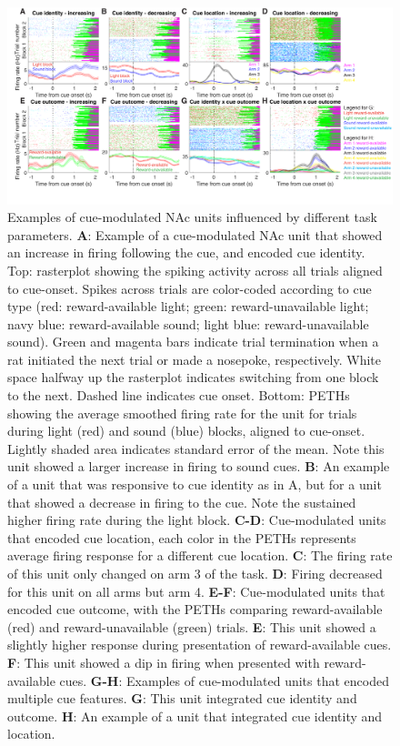 \documentclass[11pt]{article}
\newcommand{\bsf}[1]{\textbf{#1}}
\begin{document}
 \begin{figure}[ht!]
\centering
\includegraphics[width=\textwidth]{Fig 4 - Neural examples.pdf}
\caption{Examples of cue-modulated NAc units influenced by different
  task parameters. \bsf{A}: Example of a cue-modulated NAc unit that showed an
  increase in firing following the cue, and encoded cue identity. Top:
  rasterplot showing the spiking activity across all trials aligned to
  cue-onset. Spikes across trials are color-coded according to cue type (red:
  reward-available light; green: reward-unavailable light; navy blue:
  reward-available sound; light blue: reward-unavailable sound). Green and
  magenta bars indicate trial termination when a rat initiated the next trial or
  made a nosepoke, respectively. White space halfway up the rasterplot indicates
  switching from one block to the next. Dashed line indicates cue onset. Bottom:
  PETHs showing the average smoothed firing rate for the unit for trials during
  light (red) and sound (blue) blocks, aligned to cue-onset. Lightly shaded area
  indicates standard error of the mean. Note this unit showed a larger increase
  in firing to sound cues. \bsf{B}: An example of a unit that was responsive to
  cue identity as in A, but for a unit that showed a decrease in firing to the
  cue. Note the sustained higher firing rate during the light block. \bsf{C-D}:
  Cue-modulated units that encoded cue location, each color in the PETHs
  represents average firing response for a different cue location. \bsf{C}: The
  firing rate of this unit only changed on arm 3 of the task. \bsf{D}: Firing
  decreased for this unit on all arms but arm 4. \bsf{E-F}: Cue-modulated units
  that encoded cue outcome, with the PETHs comparing reward-available (red) and
  reward-unavailable (green) trials. \bsf{E}: This unit showed a slightly higher
  response during presentation of reward-available cues. \bsf{F}: This unit
  showed a dip in firing when presented with reward-available cues. \bsf{G-H}:
  Examples of cue-modulated units that encoded multiple cue features. \bsf{G}:
  This unit integrated cue identity and outcome. \bsf{H}: An example of a unit
  that integrated cue identity and location.}
\label{fig:examples}
\end{figure} \clearpage
\end{document}
